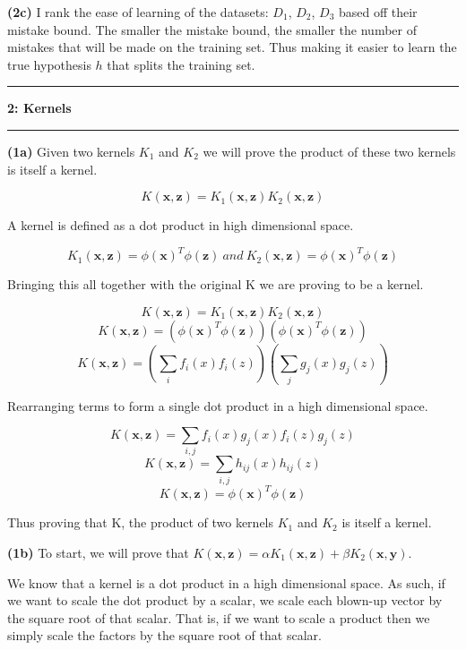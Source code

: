 \documentclass[11pt]{article}
\newcommand\question[2]{\vspace{.25in}\hrule\textbf{#1: #2}\vspace{.5em}\hrule\vspace{.10in}}
\renewcommand\part[1]{\vspace{.10in}\textbf{(#1)}}
\begin{document}
\part{2c} I rank the ease of learning of the datasets: $D_1$, $D_2$, $D_3$ based off their mistake bound. The smaller the mistake bound, the smaller the number of mistakes that will be made on the training set. Thus making it easier to learn the true hypothesis $h$ that splits the training set. 

\question{2}{Kernels}

\part{1a} Given two kernels $K_1$ and $K_2$ we will prove the product of these two kernels is itself a kernel.

$$K(\mathbf{x},\mathbf{z}) = K_1(\mathbf{x, z})K_2(\mathbf{x,z})$$

A kernel is defined as a dot product in high dimensional space.

$$K_1(\mathbf{x, z}) = \phi(\mathbf{x})^T\phi(\mathbf{z}) \ and \ K_2(\mathbf{x, z}) = \phi(\mathbf{x})^T\phi(\mathbf{z})$$

Bringing this all together with the original K we are proving to be a kernel.

$$K(\mathbf{x},\mathbf{z}) = K_1(\mathbf{x, z})K_2(\mathbf{x,z})$$
$$K(\mathbf{x},\mathbf{z}) = (\phi(\mathbf{x})^T\phi(\mathbf{z}))(\phi(\mathbf{x})^T\phi(\mathbf{z}))$$
$$K(\mathbf{x},\mathbf{z}) = (\sum_i f_i(x)f_i(z))(\sum_j g_j(x)g_j(z))$$

Rearranging terms to form a single dot product in a high dimensional space.

$$K(\mathbf{x},\mathbf{z}) = \sum_{i,j} f_i(x)g_j(x) f_i(z)g_j(z)$$
$$K(\mathbf{x}, \mathbf{z}) = \sum_{i,j} h_{ij}(x) h_{ij}(z)$$
$$K(\mathbf{x}, \mathbf{z}) = \phi(\mathbf{x})^T\phi(\mathbf{z})$$

Thus proving that K, the product of two kernels $K_1$ and $K_2$ is itself a kernel.

\part{1b} To start, we will prove that $K(\mathbf{x, z}) = \alpha K_1(\mathbf{x, z}) + \beta K_2(\mathbf{x, y})$.

We know that a kernel is a dot product in a high dimensional space. As such, if we want to scale the dot product by a scalar, we scale each blown-up vector by the square root of that scalar. That is, if we want to scale a product then we simply scale the factors by the square root of that scalar.
\end{document}
